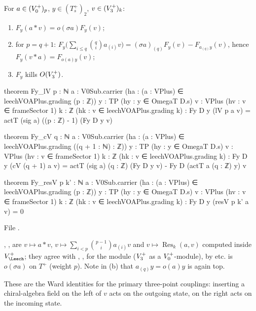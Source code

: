 \begin{theorem}\label{ch14:thm:Fy}
For $a\in(V_0^{+})_p$, $y\in(T_s^+)_2$, $v\in(V_3^{+})_k$:
\begin{enumerate}[label=(\alph*)]
\item $F_y(a*v)=o(\sigma a)F_y(v)$;
\item for $p=q+1$: $F_y\bigl(\sum_{i\le q}\binom qi a_{(i)}v\bigr)=(\sigma a)_{(q)}F_y(v)-F_{a_{(q)}y}(v)$, hence
  $F_y(v*a)=F_{o(a)y}(v)$;
\item $F_y$ kills $O(V_3^{+})$.
\end{enumerate}
\end{theorem}
\begin{leancode}
theorem Fy_lV {p : ℕ} {a : V0Sub.carrier} (ha : (a : VPlus) ∈ leechVOAPlus.grading (p : ℤ))
    {y : TP} (hy : y ∈ OmegaT D.s) {v : VPlus} (hv : v ∈ frameSector 1) {k : ℤ}
    (hk : v ∈ leechVOAPlus.grading k) :
    Fy D y (lV p a v) = actT (sig a) ((p : ℤ) - 1) (Fy D y v)

theorem Fy_cV {q : ℕ} {a : V0Sub.carrier} (ha : (a : VPlus) ∈ leechVOAPlus.grading ((q + 1 : ℕ) : ℤ))
    {y : TP} (hy : y ∈ OmegaT D.s) {v : VPlus} (hv : v ∈ frameSector 1) {k : ℤ}
    (hk : v ∈ leechVOAPlus.grading k) :
    Fy D y (cV (q + 1) a v) = actT (sig a) (q : ℤ) (Fy D y v) - Fy D (actT a (q : ℤ) y) v

theorem Fy_resV {p k' : ℕ} {a : V0Sub.carrier} (ha : (a : VPlus) ∈ leechVOAPlus.grading (p : ℤ))
    {y : TP} (hy : y ∈ OmegaT D.s) {v : VPlus} (hv : v ∈ frameSector 1) {k : ℤ}
    (hk : v ∈ leechVOAPlus.grading k) : Fy D y (resV p k' a v) = 0
\end{leancode}
File .

\begin{dictionary}
, ,  are $v\mapsto a*v$, $v\mapsto\sum_{i<p}\binom{p-1}ia_{(i)}v$ and
$v\mapsto\operatorname{Res}_k(a,v)$ computed inside $V_\Leech^+$; they agree with , ,
 for the module  ($V_3^{+}$ as a $V_0^{+}$-module), by  etc.
 is $o(\sigma a)$ on $T^+$ (weight $p$).  Note in (b) that $a_{(q)}y=o(a)y$ is again top.
\end{dictionary}

\begin{physics}
These are the Ward identities for the primary three-point couplings: inserting a chiral-algebra
field on the left of $v$ acts on the outgoing state, on the right acts on the incoming state.
\end{physics}

